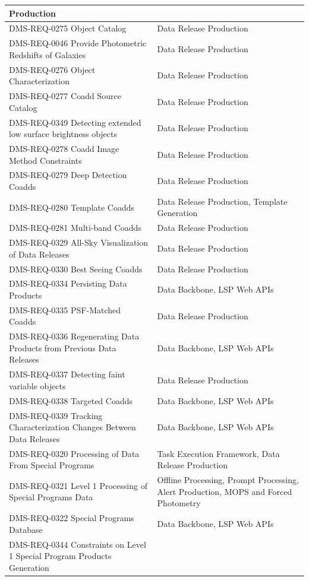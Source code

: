 \documentclass[DM,lsstdraft,toc]{lsstdoc}
\begin{document}
\begin{xtabular}{|p{0.4\textwidth}|p{0.55\textwidth}|}
Production\\ \hline
DMS-REQ-0275 Object Catalog & Data Release Production\\ \hline
DMS-REQ-0046 Provide Photometric Redshifts of Galaxies & Data Release
Production\\ \hline
DMS-REQ-0276 Object Characterization & Data Release
Production\\ \hline
DMS-REQ-0277 Coadd Source Catalog & Data Release
Production\\ \hline
DMS-REQ-0349 Detecting extended low surface brightness objects & Data
Release Production\\ \hline
DMS-REQ-0278 Coadd Image Method Constraints & Data Release
Production\\ \hline
DMS-REQ-0279 Deep Detection Coadds & Data Release
Production\\ \hline
DMS-REQ-0280 Template Coadds & Data Release Production, Template
Generation\\ \hline
DMS-REQ-0281 Multi-band Coadds & Data Release Production\\ \hline
DMS-REQ-0329 All-Sky Visualization of Data Releases & Data Release
Production\\ \hline
DMS-REQ-0330 Best Seeing Coadds & Data Release Production\\ \hline
DMS-REQ-0334 Persisting Data Products & Data Backbone, LSP Web APIs\\ \hline
DMS-REQ-0335 PSF-Matched Coadds & Data Release Production\\ \hline
DMS-REQ-0336 Regenerating Data Products from Previous Data Releases &
Data Backbone, LSP Web APIs\\ \hline
DMS-REQ-0337 Detecting faint variable objects & Data Release
Production\\ \hline
DMS-REQ-0338 Targeted Coadds & Data Backbone, LSP Web APIs\\ \hline
DMS-REQ-0339 Tracking Characterization Changes Between Data Releases &
Data Backbone, LSP Web APIs\\ \hline
DMS-REQ-0320 Processing of Data From Special Programs & Task Execution
Framework, Data Release Production\\ \hline
DMS-REQ-0321 Level 1 Processing of Special Programs Data & Offline
Processing, Prompt Processing, Alert Production, MOPS and Forced
Photometry\\ \hline
DMS-REQ-0322 Special Programs Database & Data Backbone, LSP Web APIs\\ \hline
DMS-REQ-0344 Constraints on Level 1 Special Program Products Generation

\end{xtabular}
\end{document}
